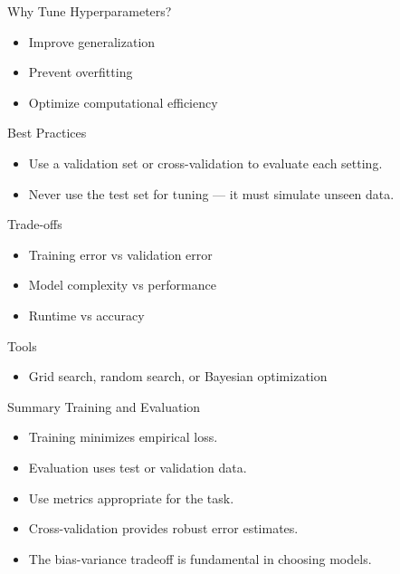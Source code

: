 \documentclass[aspectratio=169]{beamer}
\begin{document}
\begin{frame}[label={sec:org726f797}]{Why Tune Hyperparameters?}
\begin{itemize}
\item Improve generalization
\item Prevent overfitting
\item Optimize computational efficiency
\end{itemize}
\end{frame}

\begin{frame}[label={sec:org5fb02ad}]{Best Practices}
\begin{itemize}
\item Use a \alert{validation set} or \alert{cross-validation} to evaluate each
setting.
\item Never use the \alert{test set} for tuning — it must simulate unseen data.
\end{itemize}
\end{frame}

\begin{frame}[label={sec:org4ec5187}]{Trade-offs}
\begin{itemize}
\item Training error vs validation error
\item Model complexity vs performance
\item Runtime vs accuracy
\end{itemize}
\end{frame}

\begin{frame}[label={sec:org68bff67}]{Tools}
\begin{itemize}
\item Grid search, random search, or Bayesian optimization
\end{itemize}
\end{frame}

\begin{frame}[label={sec:orgd336f16}]{Summary Training and Evaluation}
\begin{itemize}
\item Training minimizes empirical loss.
\item Evaluation uses test or validation data.
\item Use metrics appropriate for the task.
\item Cross-validation provides robust error estimates.
\item The bias-variance tradeoff is fundamental in choosing models.
\end{itemize}
\end{frame}
\end{document}
